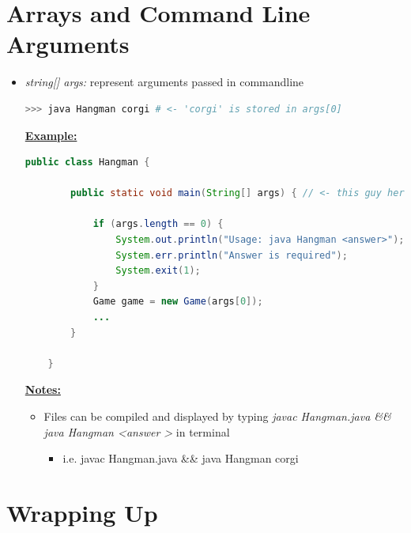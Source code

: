\documentclass[12pt]{article}
\begin{document}
\bigskip

\section{Arrays and Command Line Arguments}

\bigskip

\begin{itemize}
    \item \textit{string[] args:} represent arguments passed in commandline


    \begin{lstlisting}[language=Bash]
    >>> java Hangman corgi # <- 'corgi' is stored in args[0]
    \end{lstlisting}

    \bigskip

    \underline{\textbf{Example:}}


    \begin{lstlisting}[language=Java,caption={lesson\_07/Hangman.java}]
    public class Hangman {

        public static void main(String[] args) { // <- this guy here :)

            if (args.length == 0) {
                System.out.println("Usage: java Hangman <answer>");
                System.err.println("Answer is required");
                System.exit(1);
            }
            Game game = new Game(args[0]);
            ...
        }

    }
    \end{lstlisting}

    \underline{\textbf{Notes:}}

    \bigskip

    \begin{itemize}
        \item Files can be compiled and displayed by typing \textit{javac Hangman.java \&\& java Hangman \textless answer \textgreater}
        in terminal
        \begin{itemize}
            \item i.e. javac Hangman.java \&\& java Hangman corgi
        \end{itemize}
    \end{itemize}
\end{itemize}

\bigskip

\section{Wrapping Up}
\end{document}

